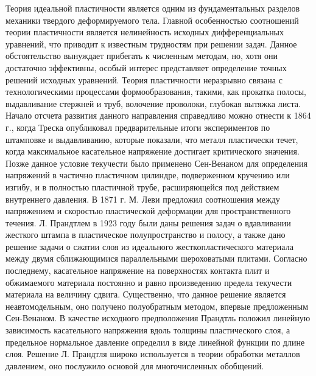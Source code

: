 
{\actuality} Теория идеальной пластичности является одним из фундаментальных разделов механики твердого деформируемого тела.
Главной особенностью соотношений теории пластичности является нелинейность исходных дифференциальных уравнений, что приводит к известным трудностям при решении задач. Данное обстоятельство вынуждает прибегать к численным методам, но, хотя они достаточно эффективны, особый интерес представляет определение точных решений исходных уравнений.
Теория пластичности неразрывно связана с технологическими процессами формообразования, такими, как прокатка полосы, выдавливание стержней и труб, волочение проволоки, глубокая вытяжка листа.
Начало отсчета развития данного направления справедливо можно отнести к 1864 г., когда Треска опубликовал  предварительные итоги экспериментов по штамповке и выдавливанию, которые показали, что металл пластически течет, когда максимальное касательное напряжение достигает критического значения. Позже данное условие текучести было применено Сен-Венаном \autocite{Todhunter:1893} для определения напряжений в частично пластичном цилиндре, подверженном кручению или изгибу, и в полностью пластичной трубе, расширяющейся под действием внутреннего давления. В 1871 г. М. Леви \autocite{Levi:1871} предложил соотношения между напряжением и скоростью пластической деформации для пространственного течения. Л. Прандтлем \autocite{Prandtl:1948} в 1923 году были даны решения задач о вдавливании жесткого штампа в пластическое полупространство и полосу, а также дано решение задачи о сжатии слоя из идеального жесткопластического материала между двумя сближающимися параллельными шероховатыми плитами. Согласно последнему, касательное напряжение на поверхностях контакта плит и обжимаемого материала постоянно и равно произведению предела текучести материала на величину сдвига. Существенно, что данное решение является неавтомодельным, оно получено полуобратным методом, впервые предложенным Сен-Венаном. В качестве исходного предположения Прандтль положил линейную зависимость касательного напряжения вдоль толщины пластического слоя, а предельное нормальное давление определил в виде линейной функции по длине слоя. Решение Л. Прандтля широко используется в теории обработки металлов давлением, оно послужило основой для многочисленных обобщений.
